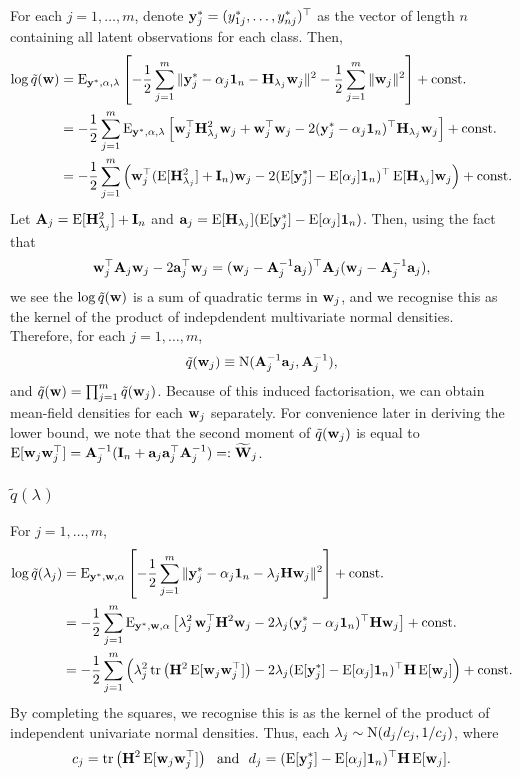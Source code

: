 For each $j = 1,\dots, m$, denote ${\mathbf y}^*_j = (y_{1j}^*, \dots, y_{nj}^*)^\top$ as the vector of length $n$ containing all latent observations for each class. Then,
\begin{align*}
  \log \tilde q({\mathbf w}) 
  &= \operatorname{E}_{{\mathbf y}^*, \alpha, \lambda} \left[ 
  - \frac{1}{2} \sum_{j=1}^m \, \lVert {\mathbf y}^*_j - \alpha_j{\mathbf 1}_{n} - {\mathbf H}_{\lambda_j} {\mathbf w}_j \rVert^2 
  - \frac{1}{2} \sum_{j=1}^m \, \lVert{\mathbf w}_j\rVert^2 
  \right] + \text{const.} \\
  &= -\frac{1}{2} \sum_{j=1}^m \operatorname{E}_{{\mathbf y}^*, \alpha, \lambda} \left[  
  {\mathbf w}_j^\top \mathbf H_{\lambda_j}^2 {\mathbf w}_j + {\mathbf w}_j^\top{\mathbf w}_j 
  - 2({\mathbf y}_j^* - \alpha_j{\mathbf 1}_n)^\top{\mathbf H}_{\lambda_j}{\mathbf w}_j 
  \right] + \text{const.} \\
  &= -\frac{1}{2} \sum_{j=1}^m \Big(  {\mathbf w}_j^\top (\operatorname{E}[\mathbf H_{\lambda_j}^2] + {\mathbf I}_{n}) {\mathbf w}_j - 2(\operatorname{E}[{\mathbf y}_j^*] - \operatorname{E}[\alpha_j]{\mathbf 1}_{n})^\top\operatorname{E}[\mathbf H_{\lambda_j}]{\mathbf w}_j \Big) + \text{const.}
\end{align*}
Let ${\mathbf A}_j = \operatorname{E}[\mathbf H_{\lambda_j}^2] + {\mathbf I}_{n}$ and ${\mathbf a}_j = \operatorname{E}[\mathbf H_{\lambda_j}](\operatorname{E}[{\mathbf y}_j^*] - \operatorname{E}[\alpha_j]{\mathbf 1}_{n})$. Then, using the fact that
\[
  {\mathbf w}_j^\top {\mathbf A}_j {\mathbf w}_j - 2 {\mathbf a}_j^\top{\mathbf w}_j = ({\mathbf w}_j - {\mathbf A}_j^{-1}{\mathbf a}_j)^\top{\mathbf A}_j({\mathbf w}_j - {\mathbf A}_j^{-1}{\mathbf a}_j),
\]
we see the $\log \tilde q({\mathbf w})$ is a sum of quadratic terms in ${\mathbf w}_j$, and we recognise this as the kernel of the product of indepdendent multivariate normal densities. Therefore, for each $j=1,\dots,m$,
\[
  \tilde q({\mathbf w}_j) \equiv \operatorname{N}({\mathbf A}_j^{-1}{\mathbf a}_j, {\mathbf A}_j^{-1}),
\]
and $\tilde q({\mathbf w}) = \prod_{j=1}^m \tilde q({\mathbf w}_j)$. Because of this induced factorisation, we can obtain mean-field densities for each ${\mathbf w}_j$ separately. For convenience later in deriving the lower bound, we note that the second moment of $\tilde q({\mathbf w}_j)$ is equal to $\operatorname{E}[{\mathbf w}_j{\mathbf w}_j^\top] = {\mathbf A}_j^{-1}({\mathbf I}_{n} + {\mathbf a}_j{\mathbf a}_j^\top{\mathbf A}_j^{-1}) =: {\widetilde{{\mathbf W}}}_j$.

\subsubsection{$\tilde q(\lambda)$}

For $j = 1,\dots,m$,
\begin{align*}
  \log \tilde q(\lambda_j) 
  &= \operatorname{E}_{{\mathbf y}^*, {\mathbf w}, \alpha} \left[ 
  - \frac{1}{2} \sum_{j=1}^m \, \lVert{\mathbf y}_j^* - \alpha_j{\mathbf 1}_{n} - \lambda_j{\mathbf H}{\mathbf w}_j\rVert^2  
  \right] + \text{const.} \\
  &= - \frac{1}{2} \sum_{j=1}^m \operatorname{E}_{{\mathbf y}^*, {\mathbf w}, \alpha} \left[ 
  \lambda_j^2 \, {\mathbf w}_j^\top {\mathbf H}^2 {\mathbf w}_j 
  - 2\lambda_j ({\mathbf y}_j^* - \alpha_j{\mathbf 1}_{n})^\top {\mathbf H} {\mathbf w}_j \right] 
  + \text{const.} \\  
  &= - \frac{1}{2} \sum_{j=1}^m \Big( \lambda_j^2 \operatorname{tr} \left(  {\mathbf H}^2 \operatorname{E}[{\mathbf w}_j {\mathbf w}_j^\top] \right) - 2 \lambda_j (\operatorname{E}[{\mathbf y}_j^*] - \operatorname{E}[\alpha_j]{\mathbf 1}_{n})^\top {\mathbf H} \operatorname{E}[{\mathbf w}_j] \Big) + \text{const.}
\end{align*}
By completing the squares, we recognise this is as the kernel of the product of independent univariate normal densities. Thus, each $\lambda_j \sim \operatorname{N}(d_j/c_j, 1/c_j)$, where
\begin{gather*}
  c_j = \operatorname{tr} \left(  {\mathbf H}^2 \operatorname{E}[{\mathbf w}_j {\mathbf w}_j^\top] \right) 
  \ \text{ and } \
  d_j = (\operatorname{E}[{\mathbf y}_j^*] - \operatorname{E}[\alpha_j]{\mathbf 1}_{n})^\top {\mathbf H} \operatorname{E}[{\mathbf w}_j].
\end{gather*}

